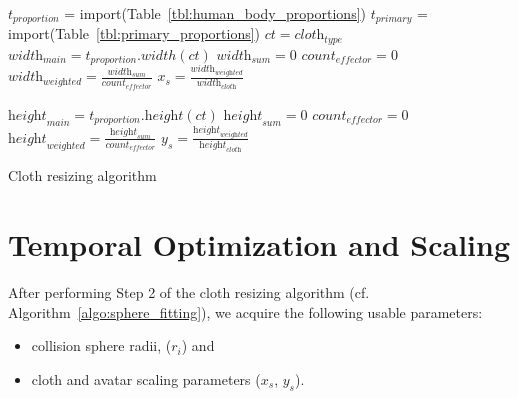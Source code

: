 \begin{algorithm}[ht]
\DontPrintSemicolon %

$t_\textit{proportion}$ = {\textrm import}({\textrm Table~\ref{tbl:human_body_proportions}}) \;
$t_\textit{primary}$ = {\textrm import}({\textrm Table~\ref{tbl:primary_proportions}}) \;
$ct=\textit{cloth}_\textit{type}$\;
$\textit{width}_\textit{main}=t_\textit{proportion}.width(ct)$\;
$\textit{width}_\textit{sum}=0$\;
$\textit{count}_\textit{effector}=0$\;
$\textit{width}_\textit{weighted}=\frac{\textit{width}_\textit{sum}}{\textit{count}_{\textit{effector}}}$\;
$x_s=\frac{\textit{width}_\textit{weighted}}{\textit{width}_\textit{cloth}}$\;

$\textit{height}_\textit{main}=t_\textit{proportion}.\textit{height}(ct)$\;
$\textit{height}_\textit{sum}=0$\;
$\textit{count}_\textit{effector}=0$\;
$\textit{height}_\textit{weighted}=\frac{\textit{height}_\textit{sum}}{\textit{count}_{\textit{effector}}}$\;
$y_s=\frac{\textit{height}_\textit{weighted}}{\textit{height}_\textit{cloth}}$\;
\caption{Cloth resizing algorithm}
\label{algo:cloth_resize}
\end{algorithm}

\section{Temporal Optimization and Scaling}
After performing Step 2 of the cloth resizing algorithm (cf. Algorithm~\ref{algo:sphere_fitting}), we acquire the following usable parameters:
\begin{itemize}
\item collision sphere radii, ($r_i$) and
\item cloth and avatar scaling parameters ($x_s$, $y_s$).
\end{itemize}

